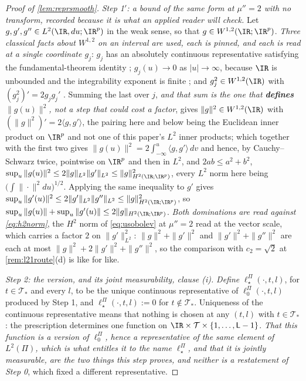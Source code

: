 \begin{proof}[Proof of \cref{lem:reprsmooth}]
\emph{Step 1$'$: a bound of the same form at $\mu''=2$ with no transform, recorded because it is what an
applied reader will check.} Let $g,g',g''\in L^{2}(\IR,du;\IR^{p})$ in the weak sense, so that
$g\in W^{1,2}(\IR;\IR^{p})$.
\emph{Three classical facts about $W^{1,2}$ on an interval are used, each is pinned, and each is read at a
single coordinate $g_j$}: $g_j$ has an
absolutely continuous representative satisfying the fundamental-theorem identity
\citep[Thm.~8.2]{brezis2011}; $g_j(u)\to0$ as $|u|\to\infty$, because $\IR$ is unbounded and the
integrability exponent is finite
\citep[Cor.~8.9]{brezis2011}; and $g_j^{2}\in W^{1,2}(\IR)$ with $(g_j^{2})'=2g_jg_j'$
\citep[Cor.~8.10]{brezis2011}. Summing the last over $j$, \emph{and that sum is the one that
\textbf{defines} $\|g(u)\|^{2}$, not a step that could cost a factor}, gives
$\|g\|^{2}\in W^{1,2}(\IR)$ with $(\|g\|^{2})'=2\langle g,g'\rangle$, the pairing here and below being the
Euclidean inner product on $\IR^{p}$ and not one of this paper's $L^{2}$ inner products; which together
with the first two gives $\|g(u)\|^{2}=2\int_{-\infty}^{u}\langle g,g'\rangle\,dv$ and hence, by
Cauchy--Schwarz twice, pointwise on $\IR^{p}$ and then in $L^{2}$, and $2ab\le a^{2}+b^{2}$,
$\sup_u\|g(u)\|^{2}\le2\|g\|_{L^{2}}\|g'\|_{L^{2}}\le\|g\|^{2}_{H^{2}(\IR;\IR^{p})}$, every $L^{2}$ norm
here being $\big(\int\|\cdot\|^{2}du\big)^{1/2}$. Applying the same inequality to
$g'$ gives $\sup_u\|g'(u)\|^{2}\le2\|g'\|_{L^{2}}\|g''\|_{L^{2}}\le\|g\|^{2}_{H^{2}(\IR;\IR^{p})}$, so
$\sup_u\|g(u)\|+\sup_u\|g'(u)\|\le2\|g\|_{H^{2}(\IR;\IR^{p})}$. \emph{Both dominations are read against
\eqref{eq:h2norm}}, the $H^{2}$ norm of \eqref{eq:usobolev} at $\mu''=2$ read at the vector scale, which carries a factor $2$ on
$\|g'\|^{2}_{L^{2}}$: $\|g\|^{2}+\|g'\|^{2}$ and $\|g'\|^{2}+\|g''\|^{2}$ are each at most
$\|g\|^{2}+2\|g'\|^{2}+\|g''\|^{2}$, so the comparison with $c_{2}=\sqrt2$ at
\cref{rem:l21route}\textup{(d)} is like for like.

\emph{Step 2: the version, and its joint measurability, clause \textup{(i)}.} \emph{Define}
$\ell^\Pi_\star(\cdot,t,l)$, for $t\in\mathcal T_\ast$ and every $l$, to be the unique continuous
representative of
$\ell^\Pi_0(\cdot,t,l)$ produced by Step 1, and $\ell^\Pi_\star(\cdot,t,l):=0$ for
$t\notin\mathcal T_\ast$. Uniqueness of the continuous representative means that nothing is chosen at any
$(t,l)$ with $t\in\mathcal T_\ast$: the prescription determines one function on
$\IR\times\mathcal T\times\{1,\dots,\mathsf L-1\}$. \emph{That this
function is a \textup{version} of $\ell^\Pi_0$, hence a representative of the same element of
$L^{2}(\Pi)$, which is what entitles it to the name $\ell^\Pi_\star$, and that it is jointly
measurable, are the two things this step proves, and neither is a restatement of Step 0}, which fixed a
different representative.


\end{proof}
